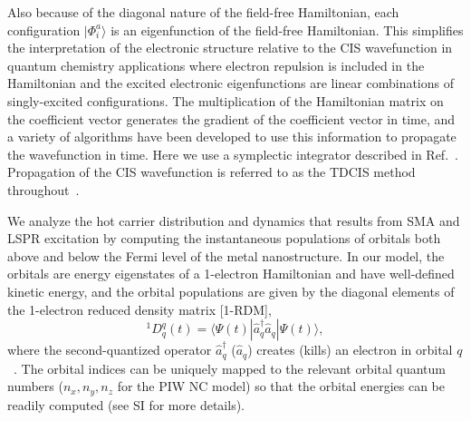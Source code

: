 \documentclass[journal=jpclcd,manuscript=article]{achemso}
\begin{document}
Also because of the diagonal nature of the field-free Hamiltonian, each configuration $|\Phi_i^a\rangle$ is an eigenfunction
of the field-free Hamiltonian.  This simplifies the interpretation of the electronic structure relative to the CIS 
wavefunction in quantum chemistry applications where electron repulsion is included in the Hamiltonian
and the excited electronic eigenfunctions are linear combinations of singly-excited configurations. 
The multiplication of the Hamiltonian matrix on the coefficient vector generates the gradient of the coefficient vector in time, and
a variety of algorithms have been developed to use this information to propagate the wavefunction in time.  Here we use a symplectic integrator
described in Ref.~.  Propagation of the CIS wavefunction is referred to as the TDCIS method 
throughout~\cite{KKS_JCP_2005,GHP_PRA_2010,DPG_PRL_2011}.

We analyze the hot carrier distribution and dynamics that results from SMA and LSPR excitation by computing the 
instantaneous populations of orbitals both above and below the Fermi level of the metal nanostructure.   
In our model, the orbitals are energy eigenstates of a 1-electron Hamiltonian and have well-defined kinetic energy,
and the orbital populations are given by the diagonal elements of the 1-electron reduced density matrix [1-RDM],
\begin{equation}
^1D^q_q(t) = \langle \Psi(t) | \hat{a}^{\dagger}_q \hat{a}_q | \Psi(t) \rangle,
\end{equation} 
where the second-quantized operator $\hat{a}_q^{\dagger}$ ($\hat{a}_q$) creates (kills) an electron
in orbital $q$~\cite{Szabo}.  The orbital indices can be uniquely mapped to the relevant orbital quantum numbers ($n_x, n_y, n_z$ for
the PIW NC model) so that the orbital energies can be readily computed (see SI for more details). 
\end{document}
